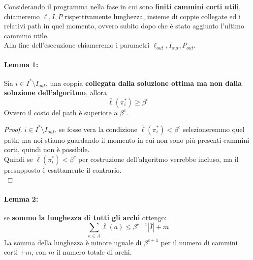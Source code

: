\documentclass[11pt]{article}
\begin{document}
	Considerando il programma nella fase in cui sono \textbf{finiti cammini corti utili}, chiameremo $\overline{\ell}, \overline{I}, \overline{P}$ rispettivamente lunghezza, insieme di coppie collegate ed i relativi path in quel momento, ovvero subito dopo che è stato aggiunto l'ultimo cammino utile.\\
	Alla fine dell'esecuzione chiameremo i parametri $\ell_{out}, I_{out}, P_{out}$.\\
	
	\paragraph{Lemma 1:} Sia $i \in I^\ast \setminus I_{out}$, una coppia \textbf{collegata dalla soluzione ottima ma non dalla soluzione dell'algoritmo}, allora 
	$$\overline{\ell} (\pi_i^\ast) \geq \beta^c$$
	Ovvero il costo del path è superiore a $\beta^c$. \\
	
	\begin{proof}
		$i \in I^\ast \setminus I_{out}$, se fosse vera la condizione $\overline{\ell} (\pi_i^\ast) < \beta^c$ selezioneremmo quel path, ma noi stiamo guardando il momento in cui non sono più presenti cammini corti, quindi non è possibile.\\
		Quindi se $\overline{\ell} (\pi_i^\ast) < \beta^c$ per costruzione dell'algoritmo verrebbe incluso, ma il presupposto è esattamente il contrario.\\
	\end{proof}
	
	\newpage
	
	\paragraph{Lemma 2:} se \textbf{sommo la lunghezza di tutti gli archi} ottengo:
	$$ \sum_{a \in A} \overline{\ell}(a) \leq \beta^{c+1} |\overline{I}| + m $$
	La somma della lunghezza è minore uguale di $\beta^{c+1}$ per il numero di cammini corti $+ m$, con $m$ il numero totale di archi.\\
	
\end{document}
